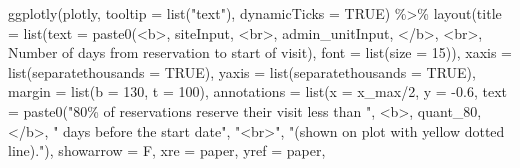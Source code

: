 \documentclass[
  11 pt,
  openany]{book}
\newenvironment{Shaded}{\begin{snugshade}}{\end{snugshade}}
\newcommand{\AttributeTok}[1]{\textcolor[rgb]{0.77,0.63,0.00}{#1}}
\newcommand{\ConstantTok}[1]{\textcolor[rgb]{0.00,0.00,0.00}{#1}}
\newcommand{\DecValTok}[1]{\textcolor[rgb]{0.00,0.00,0.81}{#1}}
\newcommand{\FloatTok}[1]{\textcolor[rgb]{0.00,0.00,0.81}{#1}}
\newcommand{\FunctionTok}[1]{\textcolor[rgb]{0.00,0.00,0.00}{#1}}
\newcommand{\NormalTok}[1]{#1}
\newcommand{\SpecialCharTok}[1]{\textcolor[rgb]{0.00,0.00,0.00}{#1}}
\newcommand{\StringTok}[1]{\textcolor[rgb]{0.31,0.60,0.02}{#1}}
\begin{document}
\begin{Shaded}
\begin{Highlighting}[]
\FunctionTok{ggplotly}\NormalTok{(plotly,}
         \AttributeTok{tooltip =} \FunctionTok{list}\NormalTok{(}\StringTok{"text"}\NormalTok{),}
         \AttributeTok{dynamicTicks =} \ConstantTok{TRUE}\NormalTok{) }\SpecialCharTok{\%\textgreater{}\%} 
  \FunctionTok{layout}\NormalTok{(}\AttributeTok{title =} 
           \FunctionTok{list}\NormalTok{(}\AttributeTok{text =} 
                  \FunctionTok{paste0}\NormalTok{(}\StringTok{\textquotesingle{}\textless{}b\textgreater{}\textquotesingle{}}\NormalTok{, siteInput, }\StringTok{\textquotesingle{}\textless{}br\textgreater{}\textquotesingle{}}\NormalTok{, admin\_unitInput, }\StringTok{\textquotesingle{}\textless{}/b\textgreater{}\textquotesingle{}}\NormalTok{,}
                         \StringTok{\textquotesingle{}\textless{}br\textgreater{}\textquotesingle{}}\NormalTok{,}
                         \StringTok{\textquotesingle{}Number of days from reservation to start of visit\textquotesingle{}}\NormalTok{),}
                \AttributeTok{font =} \FunctionTok{list}\NormalTok{(}\AttributeTok{size =} \DecValTok{15}\NormalTok{)),}
         \AttributeTok{xaxis =} \FunctionTok{list}\NormalTok{(}\AttributeTok{separatethousands =} \ConstantTok{TRUE}\NormalTok{),}
         \AttributeTok{yaxis =} \FunctionTok{list}\NormalTok{(}\AttributeTok{separatethousands =} \ConstantTok{TRUE}\NormalTok{),}
         \AttributeTok{margin =} \FunctionTok{list}\NormalTok{(}\AttributeTok{b =} \DecValTok{130}\NormalTok{, }\AttributeTok{t =} \DecValTok{100}\NormalTok{), }
         \AttributeTok{annotations =}  
           \FunctionTok{list}\NormalTok{(}\AttributeTok{x =}\NormalTok{ x\_max}\SpecialCharTok{/}\DecValTok{2}\NormalTok{, }\AttributeTok{y =} \SpecialCharTok{{-}}\FloatTok{0.6}\NormalTok{, }
                \AttributeTok{text =} 
                  \FunctionTok{paste0}\NormalTok{(}\StringTok{"80\% of reservations reserve their visit less than "}\NormalTok{, }
                         \StringTok{\textquotesingle{}\textless{}b\textgreater{}\textquotesingle{}}\NormalTok{, quant\_80, }\StringTok{\textquotesingle{}\textless{}/b\textgreater{}\textquotesingle{}}\NormalTok{, }
                         \StringTok{" days before the start date"}\NormalTok{, }
                         \StringTok{"\textless{}br\textgreater{}"}\NormalTok{,}
                         \StringTok{"(shown on plot with yellow dotted line)."}\NormalTok{), }
                \AttributeTok{showarrow =}\NormalTok{ F, }
                \AttributeTok{xre =} \StringTok{\textquotesingle{}paper\textquotesingle{}}\NormalTok{, }\AttributeTok{yref =} \StringTok{\textquotesingle{}paper\textquotesingle{}}\NormalTok{, }

\end{Highlighting}
\end{Shaded}
\end{document}
